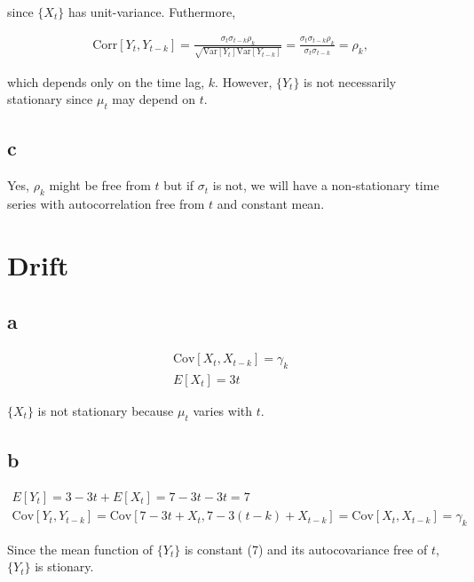 \documentclass[]{book}
\theoremstyle{definition}
\theoremstyle{definition}
\theoremstyle{remark}
\begin{document}
since \(\{X_t\}\) has unit-variance. Futhermore,

\begin{gather*}
  \text{Corr}[Y_t, Y_{t-k}] = \frac{\sigma_t \sigma_{t-k} \rho_k}{\sqrt{\text{Var}[Y_t]\text{Var}[Y_{t-k}]}} = 
    \frac{\sigma_t \sigma_{t-k}\rho_k}{\sigma_t \sigma_{t-k}} = \rho_k,
\end{gather*}

which depends only on the time lag, \(k\). However, \(\{Y_t\}\) is not
necessarily stationary since \(\mu_t\) may depend on \(t\).

\subsection*{c}\label{c-3}

Yes, \(\rho_k\) might be free from \(t\) but if \(\sigma_t\) is not, we
will have a non-stationary time series with autocorrelation free from
\(t\) and constant mean.

\section{Drift}\label{drift}

\subsection*{a}\label{a-8}

\begin{gather*}
  \text{Cov}[X_t, X_{t-k}] = \gamma_k\\
  E[X_t] = 3t
\end{gather*}

\(\{X_t\}\) is not stationary because \(\mu_t\) varies with \(t\).

\subsection*{b}\label{b-8}

\begin{gather*}
  E[Y_t] = 3 - 3t+E[X_t] = 7 - 3t - 3t = 7\\
  \text{Cov}[Y_t, Y_{t-k}] = \text{Cov}[7-3t+X_t,7-3(t-k)+X_{t-k}] = \text{Cov}[X_t, X_{t-k}] = \gamma_k
\end{gather*}

Since the mean function of \(\{Y_t\}\) is constant (7) and its
autocovariance free of \(t\), \(\{Y_t\}\) is stionary.
\end{document}
